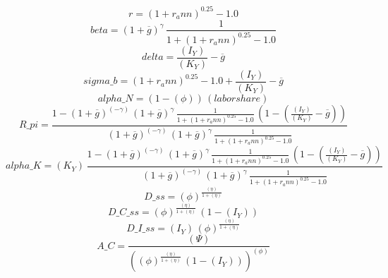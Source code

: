 \begin{dmath*}
r = \left(1+{{r_ann}}\right)^{0.25}-1.0
\end{dmath*}
\begin{dmath*}
beta = \left(1+{{\overline{g}}}\right)^{{{\gamma}}}\, \frac{1}{1+\left(1+{{r_ann}}\right)^{0.25}-1.0}
\end{dmath*}
\begin{dmath*}
delta = \frac{{(I_Y)}}{{(K_Y)}}-{{\overline{g}}}
\end{dmath*}
\begin{dmath*}
sigma\_b = \left(1+{{r_ann}}\right)^{0.25}-1.0+\frac{{(I_Y)}}{{(K_Y)}}-{{\overline{g}}}
\end{dmath*}
\begin{dmath*}
alpha\_N = \left(1-{(\phi)}\right)\, {(labor share)}
\end{dmath*}
\begin{dmath*}
R\_pi = \frac{1-\left(1+{{\overline{g}}}\right)^{\left(-{{\gamma}}\right)}\, \left(1+{{\overline{g}}}\right)^{{{\gamma}}}\, \frac{1}{1+\left(1+{{r_ann}}\right)^{0.25}-1.0}\, \left(1-\left(\frac{{(I_Y)}}{{(K_Y)}}-{{\overline{g}}}\right)\right)}{\left(1+{{\overline{g}}}\right)^{\left(-{{\gamma}}\right)}\, \left(1+{{\overline{g}}}\right)^{{{\gamma}}}\, \frac{1}{1+\left(1+{{r_ann}}\right)^{0.25}-1.0}}
\end{dmath*}
\begin{dmath*}
alpha\_K = {(K_Y)}\, \frac{1-\left(1+{{\overline{g}}}\right)^{\left(-{{\gamma}}\right)}\, \left(1+{{\overline{g}}}\right)^{{{\gamma}}}\, \frac{1}{1+\left(1+{{r_ann}}\right)^{0.25}-1.0}\, \left(1-\left(\frac{{(I_Y)}}{{(K_Y)}}-{{\overline{g}}}\right)\right)}{\left(1+{{\overline{g}}}\right)^{\left(-{{\gamma}}\right)}\, \left(1+{{\overline{g}}}\right)^{{{\gamma}}}\, \frac{1}{1+\left(1+{{r_ann}}\right)^{0.25}-1.0}}
\end{dmath*}
\begin{dmath*}
D\_ss = {(\phi)}^{\frac{{(\eta)}}{1+{(\eta)}}}
\end{dmath*}
\begin{dmath*}
D\_C\_ss = {(\phi)}^{\frac{{(\eta)}}{1+{(\eta)}}}\, \left(1-{(I_Y)}\right)
\end{dmath*}
\begin{dmath*}
D\_I\_ss = {(I_Y)}\, {(\phi)}^{\frac{{(\eta)}}{1+{(\eta)}}}
\end{dmath*}
\begin{dmath*}
A\_C = \frac{{(\Psi)}}{\left({(\phi)}^{\frac{{(\eta)}}{1+{(\eta)}}}\, \left(1-{(I_Y)}\right)\right)^{{(\phi)}}}
\end{dmath*}
